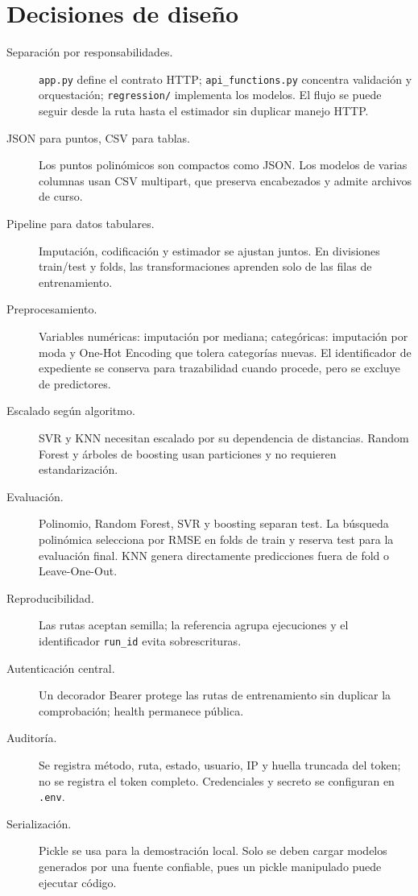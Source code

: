 \documentclass[11pt,a4paper]{article}
\begin{document}
\section{Decisiones de diseño}
\begin{description}
\item[Separación por responsabilidades.] \texttt{app.py} define el contrato HTTP; \texttt{api\_functions.py} concentra validación y orquestación; \texttt{regression/} implementa los modelos. El flujo se puede seguir desde la ruta hasta el estimador sin duplicar manejo HTTP.
\item[JSON para puntos, CSV para tablas.] Los puntos polinómicos son compactos como JSON. Los modelos de varias columnas usan CSV multipart, que preserva encabezados y admite archivos de curso.
\item[Pipeline para datos tabulares.] Imputación, codificación y estimador se ajustan juntos. En divisiones train/test y folds, las transformaciones aprenden solo de las filas de entrenamiento.
\item[Preprocesamiento.] Variables numéricas: imputación por mediana; categóricas: imputación por moda y One-Hot Encoding que tolera categorías nuevas. El identificador de expediente se conserva para trazabilidad cuando procede, pero se excluye de predictores.
\item[Escalado según algoritmo.] SVR y KNN necesitan escalado por su dependencia de distancias. Random Forest y árboles de boosting usan particiones y no requieren estandarización.
\item[Evaluación.] Polinomio, Random Forest, SVR y boosting separan test. La búsqueda polinómica selecciona por RMSE en folds de train y reserva test para la evaluación final. KNN genera directamente predicciones fuera de fold o Leave-One-Out.
\item[Reproducibilidad.] Las rutas aceptan semilla; la referencia agrupa ejecuciones y el identificador \texttt{run\_id} evita sobrescrituras.
\item[Autenticación central.] Un decorador Bearer protege las rutas de entrenamiento sin duplicar la comprobación; health permanece pública.
\item[Auditoría.] Se registra método, ruta, estado, usuario, IP y huella truncada del token; no se registra el token completo. Credenciales y secreto se configuran en \texttt{.env}.
\item[Serialización.] Pickle se usa para la demostración local. Solo se deben cargar modelos generados por una fuente confiable, pues un pickle manipulado puede ejecutar código.
\end{description}
\end{document}
